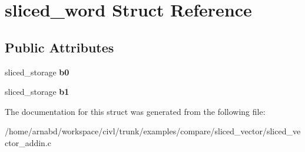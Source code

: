 \hypertarget{structsliced__word}{}\section{sliced\+\_\+word Struct Reference}
\label{structsliced__word}
\subsection*{Public Attributes}
\begin{DoxyCompactItemize}
\item 
\hypertarget{structsliced__word_aab2417e46bc632e9f79297378a774c89}{}sliced\+\_\+storage {\bfseries b0}\label{structsliced__word_aab2417e46bc632e9f79297378a774c89}

\item 
\hypertarget{structsliced__word_ae7d769f58115e5ca14590950aae87296}{}sliced\+\_\+storage {\bfseries b1}\label{structsliced__word_ae7d769f58115e5ca14590950aae87296}

\end{DoxyCompactItemize}


The documentation for this struct was generated from the following file\+:\begin{DoxyCompactItemize}
\item 
/home/arnabd/workspace/civl/trunk/examples/compare/sliced\+\_\+vector/sliced\+\_\+vector\+\_\+addin.\+c\end{DoxyCompactItemize}
